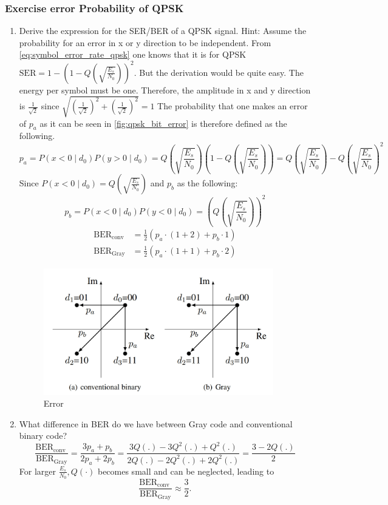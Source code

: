 \subsubsection{Exercise error Probability of QPSK}
\begin{enumerate}
    \item Derive the expression for the SER/BER of a QPSK signal. Hint: Assume the probability for an error in x or y direction to be independent.\newline
    From \autoref{eq:symbol_error_rate_qpsk} one knows that it is for QPSK $\mathrm{SER}=1-\left(1-Q\left(\sqrt{\frac{E_s}{N_0}}\right)\right)^2$. \newline But the derivation would be quite easy. The energy per symbol must be one. Therefore, the amplitude in x and y direction is $\frac{1}{\sqrt{2}}$ since $\sqrt{(\frac{1}{\sqrt{2}})^2+(\frac{1}{\sqrt{2}})^2}=1$ The probability that one makes an error of $p_a$ as it can be seen in \autoref{fig:qpsk_bit_error} is therefore defined as the following.
    $$
    p_a=P\left(x<0 \mid d_0\right) P\left(y>0 \mid d_0\right)=Q\left(\sqrt{\frac{E_s}{N_0}}\right)\left(1-Q\left(\sqrt{\frac{E_s}{N_0}}\right)\right)=Q\left(\sqrt{\frac{E_s}{N_0}}\right)-Q\left(\sqrt{\frac{E_s}{N_0}}\right)^2
    $$
    Since $P\left(x<0 \mid d_0\right)=Q\left(\sqrt{\frac{E_s}{N_0}}\right)$ and $p_b$ as the following:
    $$
    p_b=P\left(x<0 \mid d_0\right) P\left(y<0 \mid d_0\right)=\left(Q\left(\sqrt{\frac{E_s}{N_0}}\right)\right)^2
    $$
    $$
    \begin{aligned}
    \mathrm{BER}_{\mathrm{conv}} & =\frac{1}{2}\left(p_a \cdot(1+2)+p_b \cdot 1\right) \\
    \mathrm{BER}_{\mathrm{Gray}} & =\frac{1}{2}\left(p_a \cdot(1+1)+p_b \cdot 2\right)
    \end{aligned}
    $$
    \begin{figure}[ht]
      \centering
      \includegraphics[width=10cm]{images/bit_error.jpg}
      \caption{Error}
      \label{fig:qpsk_bit_error}
    \end{figure}
    \item What difference in BER do we have between Gray code and conventional binary code?\newline
    $$
    \frac{\mathrm{BER}_{\text {conv }}}{\mathrm{BER}_{\mathrm{Gray}}}=\frac{3 p_a+p_b}{2 p_a+2 p_b}=\frac{3 Q(.)-3 Q^2(.)+Q^2(.)}{2 Q(.)-2 Q^2(.)+2 Q^2(.)}=\frac{3-2 Q(.)}{2}
    $$
    For larger $\frac{E_s}{N_0}, Q(\cdot)$ becomes small and can be neglected, leading to
    $$
    \frac{\mathrm{BER}_{\text {conv }}}{\mathrm{BER}_{\mathrm{Gray}}} \approx \frac{3}{2} .
    $$
\end{enumerate}



